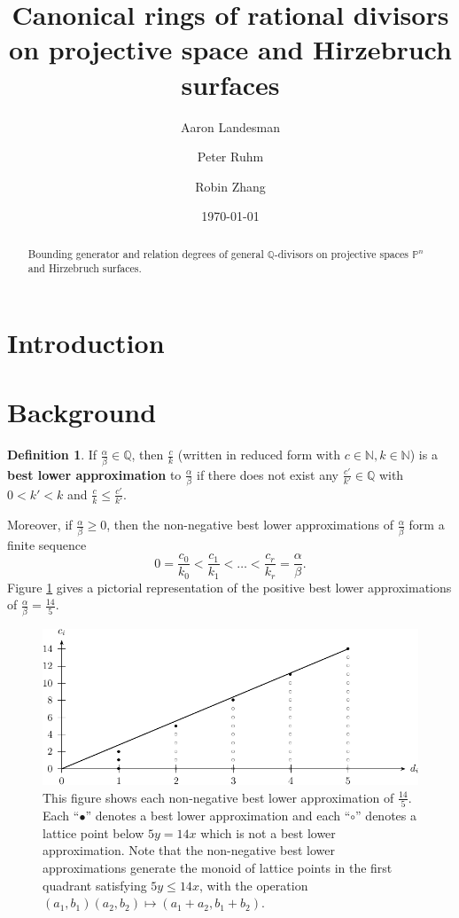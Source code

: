 \documentclass{amsart}
\title{Canonical rings of rational divisors on projective space and Hirzebruch surfaces}
\author{Aaron Landesman}
\author{Peter Ruhm}
\author{Robin Zhang}
\date{\today}
\theoremstyle{plain}
\theoremstyle{definition}
\newtheorem{defn}[thm]{Definition}
\theoremstyle{remark}
\numberwithin{equation}{section}
\newcommand\bn{{\mathbb N}}
\newcommand\bq{{\mathbb Q}}
\newcommand\bp{{\mathbb P}}
\begin{document}
\begin{abstract}
 	Bounding generator and relation degrees of general $\bq$-divisors
	on projective spaces $\bp^n$ and Hirzebruch surfaces.
\end{abstract}

\maketitle


\section{Introduction}

\section{Background}

\begin{defn}
\label{defn:lower-approximation}
If $\frac{\alpha}{\beta}\in \bq$, then $\frac{c}{k}$ (written in
reduced form with $c \in \bn, k \in \bn$) is a {\bf{best lower
approximation}} to $\frac{\alpha}{\beta}$ if there does not exist
any $\frac{c'}{k'}\in \bq$ with $0 < k'<k$ and $\frac{c}{k} \le
\frac{c'}{k'}$.
\end{defn}

Moreover, if $\frac{\alpha}{\beta}\ge 0$, then the non-negative
best lower approximations of $\frac{\alpha}{\beta}$ form a finite
sequence
\[
	0 = \frac{c_0}{k_0} < \frac{c_1}{k_1} < \ldots < \frac{c_r}{k_r} = \frac{\alpha}{\beta}.
\]
Figure \ref{fig:s14/5-lattice} gives a pictorial representation of
the positive best lower approximations of $\frac{\alpha}{\beta} =
\frac{14}{5}$.

\begin{figure}
\includegraphics{pics/spin-lower-approximations-pic-pics.pdf}
\caption{This figure shows each non-negative best lower
approximation of $\frac{14}{5}.$ Each ``$\bullet$'' denotes a best
lower approximation and each ``$\circ$'' denotes a lattice point
below $5y=14x$ which is not a best lower approximation.  Note that
the non-negative best lower approximations generate the monoid of
lattice points in the first quadrant satisfying  $5y \le 14x$, with
the operation $(a_1, b_1)(a_2, b_2)\mapsto (a_1 + a_2, b_1 + b_2)$.}
\label{fig:s14/5-lattice}
\end{figure}
\end{document}

